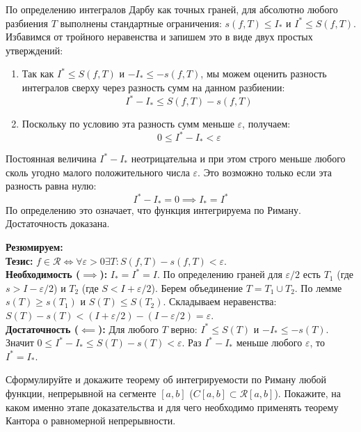 По определению интегралов Дарбу как точных граней, для абсолютно любого разбиения $T$ выполнены стандартные ограничения: $s(f, T) \le I_*$ и $I^* \le S(f, T)$. Избавимся от тройного неравенства и запишем это в виде двух простых утверждений:
\begin{enumerate}
    \item Так как $I^* \le S(f, T)$ и $-I_* \le -s(f, T)$, мы можем оценить разность интегралов сверху через разность сумм на данном разбиении:
    $$ I^* - I_* \le S(f, T) - s(f, T) $$
    \item Поскольку по условию эта разность сумм меньше $\varepsilon$, получаем:
    $$ 0 \le I^* - I_* < \varepsilon $$
\end{enumerate}
Постоянная величина $I^* - I_*$ неотрицательна и при этом строго меньше любого сколь угодно малого положительного числа $\varepsilon$. Это возможно только если эта разность равна нулю:
$$ I^* - I_* = 0 \implies I_* = I^* $$
По определению это означает, что функция интегрируема по Риману. Достаточность доказана.


\begin{tcolorbox}[colback=gray!5, colframe=black, boxrule=0.5pt, arc=0pt]
\textbf{Резюмируем:} \\
\textbf{Тезис:} $f \in \mathcal{R} \iff \forall \varepsilon > 0 \exists T: S(f,T) - s(f,T) < \varepsilon$. \\
\textbf{Необходимость ($\implies$):} $I_* = I^* = I$. По определению граней для $\varepsilon/2$ есть $T_1$ (где $s > I - \varepsilon/2$) и $T_2$ (где $S < I + \varepsilon/2$). Берем объединение $T = T_1 \cup T_2$. По лемме $s(T) \ge s(T_1)$ и $S(T) \le S(T_2)$. Складываем неравенства: $S(T) - s(T) < (I+\varepsilon/2) - (I-\varepsilon/2) = \varepsilon$. \\
\textbf{Достаточность ($\impliedby$):} Для любого $T$ верно: $I^* \le S(T)$ и $-I_* \le -s(T)$. Значит $0 \le I^* - I_* \le S(T) - s(T) < \varepsilon$. Раз $I^* - I_*$ меньше любого $\varepsilon$, то $I^* = I_*$.
\end{tcolorbox}







{Сформулируйте и докажите теорему об интегрируемости по Риману любой функции, непрерывной на сегменте $[a, b]$ ($C[a,b]\subset\mathcal{R}[a,b]$). Покажите, на каком именно этапе доказательства и для чего необходимо применять теорему Кантора о равномерной непрерывности.}


